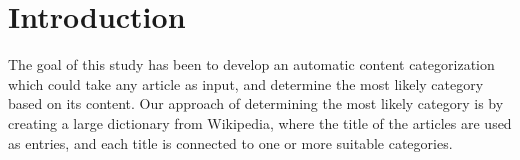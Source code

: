 \chapter{Introduction}
The goal of this study has been to develop an automatic content categorization which could take any article as input, and determine the most likely category based on its content. Our approach of determining the most likely category is by creating a large dictionary from Wikipedia, where the title of the articles are used as entries, and each title is connected to one or more suitable categories.




%
